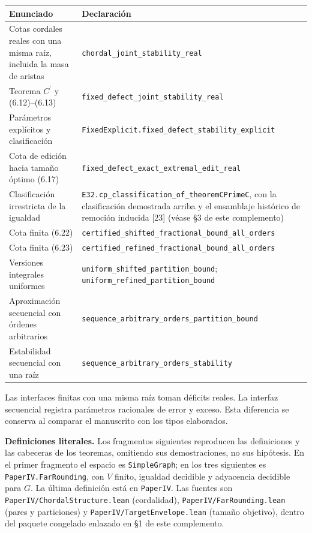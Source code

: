 \documentclass[spanish,11pt,a4paper]{article}
\newcounter{none}
\begin{document}
{\def\LTcaptype{none} %
\begin{longtable}[]{@{}
  >{\raggedright\arraybackslash}p{}
  >{\raggedright\arraybackslash}p{}@{}}
\toprule\noalign{}
\begin{minipage}[b]{\linewidth}\raggedright
Enunciado
\end{minipage} & \begin{minipage}[b]{\linewidth}\raggedright
Declaración
\end{minipage} \\
\midrule\noalign{}
\endhead
\bottomrule\noalign{}
\endlastfoot
Cotas cordales reales con una misma raíz, incluida la masa de aristas &
\nolinkurl{chordal_joint_stability_real} \\
Teorema \(C^\prime\) y (6.12)--(6.13) &
\nolinkurl{fixed_defect_joint_stability_real} \\
Parámetros explícitos y clasificación &
\nolinkurl{FixedExplicit.fixed_defect_stability_explicit} \\
Cota de edición hacia tamaño óptimo (6.17) &
\nolinkurl{fixed_defect_exact_extremal_edit_real} \\
Clasificación irrestricta de la igualdad &
\nolinkurl{E32.cp_classification_of_theoremCPrimeC}, con la
clasificación demostrada arriba y el ensamblaje histórico de remoción
inducida {[}23{]} (véase §3 de este complemento) \\
Cota finita (6.22) &
\nolinkurl{certified_shifted_fractional_bound_all_orders} \\
Cota finita (6.23) &
\nolinkurl{certified_refined_fractional_bound_all_orders} \\
Versiones integrales uniformes &
\nolinkurl{uniform_shifted_partition_bound};
\nolinkurl{uniform_refined_partition_bound} \\
Aproximación secuencial con órdenes arbitrarios &
\nolinkurl{sequence_arbitrary_orders_partition_bound} \\
Estabilidad secuencial con una raíz &
\nolinkurl{sequence_arbitrary_orders_stability} \\
\end{longtable}
}

Las interfaces finitas con una misma raíz toman déficits reales. La
interfaz secuencial registra parámetros racionales de error y exceso.
Esta diferencia se conserva al comparar el manuscrito con los tipos
elaborados.

\textbf{Definiciones literales.} Los fragmentos siguientes reproducen
las definiciones y las cabeceras de los teoremas, omitiendo sus
demostraciones, no sus hipótesis. En el primer fragmento el espacio es
\nolinkurl{SimpleGraph}; en los tres siguientes es
\nolinkurl{PaperIV.FarRounding}, con \(V\) finito, igualdad decidible y
adyacencia decidible para \(G\). La última definición está en
\nolinkurl{PaperIV}. Las fuentes son \nolinkurl{PaperIV/ChordalStructure.lean}
(cordalidad), \nolinkurl{PaperIV/FarRounding.lean} (pares y particiones) y
\nolinkurl{PaperIV/TargetEnvelope.lean} (tamaño objetivo), dentro del
paquete congelado enlazado en §1 de este complemento.
\end{document}
